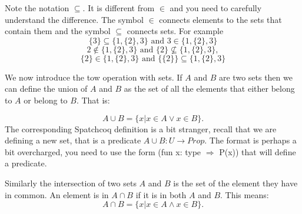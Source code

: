 Note the notation $\subseteq$. It is different from $\in$ and you need to carefully understand the difference. The symbol $\in$ connects elements to the sets that contain them and the symbol $\subseteq$ connects sets. For example
$$\{ 3\}\subseteq \{1, \{2\},3\}\mbox{ and }3 \in   \{1, \{2\},3\}$$ $$ 2\not\in  \{1, \{2\},3\} \mbox{ and } \{2\} \not\subseteq  \{1, \{2\},3\}, $$ $$\{2\} \in  \{1, \{2\},3\}\mbox{ and } \{\{2\}\} \subseteq  \{1, \{2\},3\}$$


We now introduce the tow operation with sets. If $A$ and $B$ are two sets then we can define the union of $A$ and $B$ as the set of all the elements that either belong to  $A$ or belong to  $B$. That is:

$$A\cup B =\{x | x \in A \lor x \in B\}.$$
The corresponding Spatchcoq definition is a bit stranger, recall that we are defining a new set, that is a predicate $A\cup B : U\rightarrow Prop$. The format is perhaps a bit overcharged, you need to use the form (fun x: type  $\Rightarrow$ P(x))  that will define a predicate.





Similarly the intersection of two sets $A$ and $B$ is the set of the element they have in common. An element is in $A\cap B$ if it is in both $A$ and $B$. This means:
$$A\cap B =\{x | x \in A \land x \in B\}.$$




